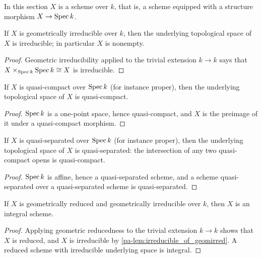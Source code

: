 In this section \(X\) is a scheme over \(k\), that is, a scheme equipped with a structure
morphism \(X \to \operatorname{Spec} k\).

\begin{lemma}[Irreducibility]
  \label{pa-lem:irreducible_of_geomirred}
  \leanok

  If \(X\) is geometrically irreducible over \(k\), then the underlying topological space of
  \(X\) is irreducible; in particular \(X\) is nonempty.
\end{lemma}
\begin{proof}
  \leanok
  Geometric irreducibility applied to the trivial extension \(k \to k\) says that
  \(X \times_{\operatorname{Spec} k} \operatorname{Spec} k \cong X\) is irreducible.
\end{proof}

\begin{lemma}
  \label{pa-lem:curve_compact}
  \leanok

  If \(X\) is quasi-compact over \(\operatorname{Spec} k\) (for instance proper), then the underlying
  topological space of \(X\) is quasi-compact.
\end{lemma}
\begin{proof}
  \leanok
  \(\operatorname{Spec} k\) is a one-point space, hence quasi-compact, and \(X\) is the preimage of it
  under a quasi-compact morphism.
\end{proof}

\begin{lemma}
  \label{pa-lem:curve_quasiseparated}
  \leanok

  If \(X\) is quasi-separated over \(\operatorname{Spec} k\) (for instance proper), then the underlying
  topological space of \(X\) is quasi-separated: the intersection of any two quasi-compact
  opens is quasi-compact.
\end{lemma}
\begin{proof}
  \leanok
  \(\operatorname{Spec} k\) is affine, hence a quasi-separated scheme, and a scheme quasi-separated over a
  quasi-separated scheme is quasi-separated.
\end{proof}

\begin{proposition}[Integrality]
  \label{pa-prop:curve_integral}
  \leanok

  If \(X\) is geometrically reduced and geometrically irreducible over \(k\), then \(X\) is an
  integral scheme.
\end{proposition}
\begin{proof}
  \leanok
  Applying geometric reducedness to the trivial extension \(k \to k\) shows that \(X\) is
  reduced, and \(X\) is irreducible by \ref{pa-lem:irreducible_of_geomirred}. A reduced scheme
  with irreducible underlying space is integral.
\end{proof}

